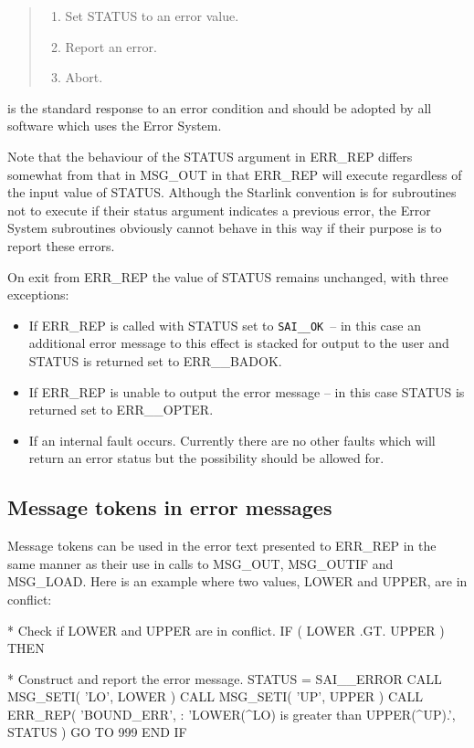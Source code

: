 \documentclass[twoside,11pt]{starlink}
\providecommand{\const}[1]{\texttt{#1}}
\providecommand{\saiok}{\const{SAI\_\_OK}}
\begin{document}
\begin {quote}
\begin {enumerate}
\item Set STATUS to an error value.
\item Report an error.
\item Abort.
\end {enumerate}
\end {quote}

is the standard response to an error condition and should be adopted by all
software which uses the Error System.

Note that the behaviour of the STATUS argument in ERR\_REP differs somewhat
from that in MSG\_OUT in that ERR\_REP will execute regardless of the input
value of STATUS.
Although the Starlink convention is for subroutines not to execute if their
status argument indicates a previous error, the Error System subroutines
obviously cannot behave in this way if their purpose is to report these
errors.

On exit from ERR\_REP the value of STATUS remains unchanged, with three
exceptions:

\begin{itemize}
\item If ERR\_REP is called with STATUS set to \saiok\ -- in this case an
additional error message
to this effect is stacked for output to the user and STATUS is returned set
to ERR\_\_BADOK.
\item If ERR\_REP is unable to output the error message -- in this case
STATUS is returned set to ERR\_\_OPTER.
\item If an internal fault occurs. Currently there are no other faults
which will return an error status but the possibility should be allowed for.
\end{itemize}


\subsection{Message tokens in error messages \label{etok_sect}}

Message tokens can be used in the error text presented to ERR\_REP
in the same manner as their use in calls to MSG\_OUT, MSG\_OUTIF and
MSG\_LOAD.
Here is an example where two values, LOWER and UPPER, are in conflict:

\begin {small}
\begin{terminalv}
*  Check if LOWER and UPPER are in conflict.
      IF ( LOWER .GT. UPPER ) THEN

*     Construct and report the error message.
         STATUS = SAI__ERROR
         CALL MSG_SETI( 'LO', LOWER )
         CALL MSG_SETI( 'UP', UPPER )
         CALL ERR_REP( 'BOUND_ERR',
     :                'LOWER(^LO) is greater than UPPER(^UP).', STATUS )
         GO TO 999
      END IF
\end{terminalv}
\end {small}
\end{document}
